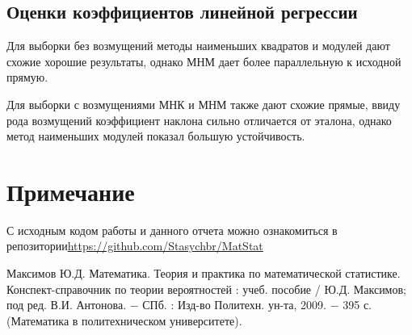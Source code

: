 \documentclass[a4paper,12pt]{article} %
\begin{document}
\subsection{Оценки коэффициентов линейной регрессии}
Для выборки без возмущений методы наименьших квадратов и модулей дают схожие хорошие результаты, однако МНМ дает более параллельную к исходной прямую.

Для выборки с возмущениями МНК и МНМ также дают схожие прямые, ввиду рода возмущений коэффициент наклона сильно отличается от эталона, однако метод наименьших модулей показал большую устойчивость.
\section*{Примечание}
С исходным кодом работы и данного отчета можно ознакомиться в репозитории\;\url{https://github.com/Stasychbr/MatStat}
\newpage
\begin{thebibliography}{9}
 Максимов Ю.Д. Математика. Теория и практика по математической статистике. Конспект-справочник по теории вероятностей : учеб. пособие /
Ю.Д. Максимов; под ред. В.И. Антонова. $-$ СПб. : Изд-во Политехн.
ун-та, 2009. $-$ 395 с. (Математика в политехническом университете).
\end{thebibliography}
\end{document}
